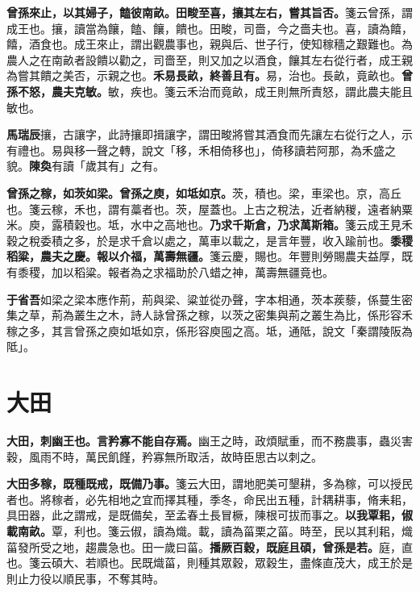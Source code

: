 \textbf{曾孫來止，以其婦子，饁彼南畝。田畯至喜，攘其左右，嘗其旨否。}{\footnotesize 箋云曾孫，謂成王也。攘，讀當為饟，饁、饟，饋也。田畯，司嗇，今之嗇夫也。喜，讀為饎，饎，酒食也。成王來止，謂出觀農事也，親與后、世子行，使知稼穡之艱難也。為農人之在南畝者設饋以勸之，司嗇至，則又加之以酒食，饟其左右從行者，成王親為嘗其饋之美否，示親之也。}\textbf{禾易長畝，終善且有。}{\footnotesize 易，治也。長畝，竟畝也。}\textbf{曾孫不怒，農夫克敏。}{\footnotesize 敏，疾也。箋云禾治而竟畝，成王則無所責怒，謂此農夫能且敏也。}

\begin{quoting}\textbf{馬瑞辰}攘，古讓字，此詩攘即揖讓字，謂田畯將嘗其酒食而先讓左右從行之人，示有禮也。易與移一聲之轉，說文「移，禾相倚移也」，倚移讀若阿那，為禾盛之貌。\textbf{陳奐}有讀「歲其有」之有。\end{quoting}

\textbf{曾孫之稼，如茨如梁。曾孫之庾，如坻如京。}{\footnotesize 茨，積也。梁，車梁也。京，高丘也。箋云稼，禾也，謂有藁者也。茨，屋蓋也。上古之稅法，近者納稯，遠者納粟米。庾，露積穀也。坻，水中之高地也。}\textbf{乃求千斯倉，乃求萬斯箱。}{\footnotesize 箋云成王見禾穀之稅委積之多，於是求千倉以處之，萬車以載之，是言年豐，收入踰前也。}\textbf{黍稷稻粱，農夫之慶。報以介福，萬壽無疆。}{\footnotesize 箋云慶，賜也。年豐則勞賜農夫益厚，既有黍稷，加以稻粱。報者為之求福助於八蜡之神，萬壽無疆竟也。}

\begin{quoting}\textbf{于省吾}如梁之梁本應作荊，荊與梁、粱並從刅聲，字本相通，茨本蒺藜，係蔓生密集之草，荊為叢生之木，詩人詠曾孫之稼，以茨之密集與荊之叢生為比，係形容禾稼之多，其言曾孫之庾如坻如京，係形容庾囤之高。坻，通阺，說文「秦謂陵阪為阺」。\end{quoting}

\section{大田}


\textbf{大田，刺幽王也。言矜寡不能自存焉。}{\footnotesize 幽王之時，政煩賦重，而不務農事，蟲災害穀，風雨不時，萬民飢饉，矜寡無所取活，故時臣思古以刺之。}

\textbf{大田多稼，既種既戒，既備乃事。}{\footnotesize 箋云大田，謂地肥美可墾耕，多為稼，可以授民者也。將稼者，必先相地之宜而擇其種，季冬，命民出五種，計耦耕事，脩耒耜，具田器，此之謂戒，是既備矣，至孟春土長冒橛，陳根可拔而事之。}\textbf{以我覃耜，俶載南畝。}{\footnotesize 覃，利也。箋云俶，讀為熾。載，讀為菑栗之菑。時至，民以其利耜，熾菑發所受之地，趨農急也。田一歲曰菑。}\textbf{播厥百穀，既庭且碩，曾孫是若。}{\footnotesize 庭，直也。箋云碩大、若順也。民既熾菑，則種其眾穀，眾穀生，盡條直茂大，成王於是則止力役以順民事，不奪其時。}

